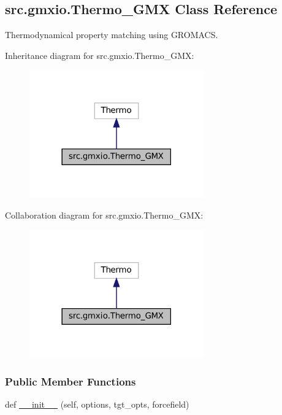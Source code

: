 \hypertarget{classsrc_1_1gmxio_1_1Thermo__GMX}{}\subsection{src.\+gmxio.\+Thermo\+\_\+\+G\+MX Class Reference}
\label{classsrc_1_1gmxio_1_1Thermo__GMX}


Thermodynamical property matching using G\+R\+O\+M\+A\+CS.  




Inheritance diagram for src.\+gmxio.\+Thermo\+\_\+\+G\+MX\+:
\nopagebreak
\begin{figure}[H]
\begin{center}
\leavevmode
\includegraphics[width=213pt]{classsrc_1_1gmxio_1_1Thermo__GMX__inherit__graph}
\end{center}
\end{figure}


Collaboration diagram for src.\+gmxio.\+Thermo\+\_\+\+G\+MX\+:
\nopagebreak
\begin{figure}[H]
\begin{center}
\leavevmode
\includegraphics[width=213pt]{classsrc_1_1gmxio_1_1Thermo__GMX__coll__graph}
\end{center}
\end{figure}
\subsubsection*{Public Member Functions}
\begin{DoxyCompactItemize}
\item 
def \hyperlink{classsrc_1_1gmxio_1_1Thermo__GMX_a28327f0cc649a64079b3290d85b1bc09}{\+\_\+\+\_\+init\+\_\+\+\_\+} (self, options, tgt\+\_\+opts, forcefield)
\end{DoxyCompactItemize}
